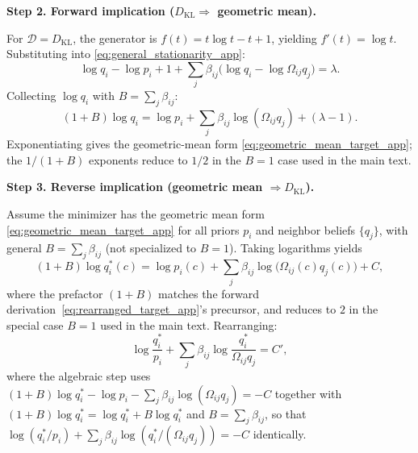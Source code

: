 \documentclass[11pt]{article}
\begin{document}
\textbf{Step 2. Forward implication ($D_{\mathrm{KL}}\Rightarrow$ geometric mean).}

For $\mathcal{D}=D_{\mathrm{KL}}$, the generator is $f(t)=t\log t - t + 1$, yielding $f'(t)=\log t$. Substituting into \eqref{eq:general_stationarity_app}:
\[
\log q_i - \log p_i + 1 + \sum_j \beta_{ij}\bigl(\log q_i - \log\Omega_{ij}q_j\bigr) = \lambda.
\]
Collecting $\log q_i$ with $B = \sum_j \beta_{ij}$:
\[
(1+B)\log q_i = \log p_i + \sum_j\beta_{ij}\log(\Omega_{ij}q_j) + (\lambda - 1).
\]
Exponentiating gives the geometric-mean form \eqref{eq:geometric_mean_target_app}; the $1/(1+B)$ exponents reduce to $1/2$ in the $B = 1$ case used in the main text.

\textbf{Step 3. Reverse implication (geometric mean $\Rightarrow D_{\mathrm{KL}}$).}

Assume the minimizer has the geometric mean form \eqref{eq:geometric_mean_target_app} for all priors $p_i$ and neighbor beliefs $\{q_j\}$, with general $B = \sum_j \beta_{ij}$ (not specialized to $B = 1$). Taking logarithms yields
\begin{equation}
(1+B)\log q_i^*(c) = \log p_i(c) + \sum_j\beta_{ij}\log\bigl(\Omega_{ij}(c)q_j(c)\bigr) + C,
\end{equation}
where the prefactor $(1+B)$ matches the forward derivation~\eqref{eq:rearranged_target_app}'s precursor, and reduces to $2$ in the special case $B = 1$ used in the main text. Rearranging:
\begin{equation}
\log\frac{q_i^*}{p_i} + \sum_j\beta_{ij}\log\frac{q_i^*}{\Omega_{ij}q_j} = C',
\label{eq:rearranged_target_app}
\end{equation}
where the algebraic step uses $(1+B)\log q_i^* - \log p_i - \sum_j\beta_{ij}\log(\Omega_{ij}q_j) = -C$ together with $(1+B)\log q_i^* = \log q_i^* + B\log q_i^*$ and $B = \sum_j\beta_{ij}$, so that $\log(q_i^*/p_i) + \sum_j\beta_{ij}\log(q_i^*/(\Omega_{ij}q_j)) = -C$ identically.
\end{document}
